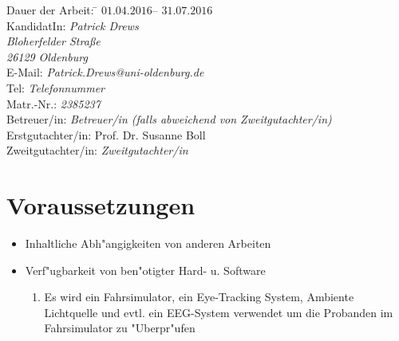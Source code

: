 \documentclass[a4paper, 11pt]{article}
\makeatletter
\newcommand{\KandidatIn}{\emph{Patrick Drews}}
\newcommand{\KandStrasse}{\emph{Bloherfelder Stra{\ss}e}}
\newcommand{\KandPlz}{\emph{26129}}
\newcommand{\KandOrt}{\emph{Oldenburg}}
\newcommand{\KandEmail}{\emph{Patrick.Drews@uni-oldenburg.de}}
\newcommand{\KandTel}{\emph{Telefonnummer}}
\newcommand{\KandMatrNr}{\emph{2385237}}
\newcommand{\StartDatum}{$01.04.2016$}
\newcommand{\EndDatum}{$31.07.2016$}
\newcommand{\GutachterIn}{Prof. Dr. Susanne Boll}%
\newcommand{\ZweitgutachterIn}{\emph{Zweitgutachter/in}} %
\newcommand{\BetreuerIn}{\emph{Betreuer/in (falls abweichend von Zweitgutachter/in)}} %
\makeatother
\begin{document}
\begin{tabbing}
Dauer der Arbeit: \hspace{1.1cm} \= \StartDatum -- \EndDatum\\
\vspace{0.5ex}KandidatIn: \> \KandidatIn\\
\> \KandStrasse\\
\> \KandPlz{} \KandOrt\\
\> E-Mail: \KandEmail{}\\
\> Tel: \KandTel{}\\
\> Matr.-Nr.: \KandMatrNr\\
\vspace{0.5ex}Betreuer/in: \> \BetreuerIn\\
Erstgutachter/in: \> \GutachterIn\\
Zweitgutachter/in: \> \ZweitgutachterIn\\
\end{tabbing}


\section {Voraussetzungen}

\begin{itemize}
\item Inhaltliche Abh"{a}ngigkeiten von anderen Arbeiten
\item Verf"{u}gbarkeit von ben"{o}tigter Hard- u. Software
	\begin{enumerate}
	\item Es wird ein Fahrsimulator, ein Eye-Tracking System, Ambiente Lichtquelle und evtl. ein EEG-System verwendet um die Probanden im Fahrsimulator zu "{U}berpr"{u}fen
	\end{enumerate}
\end{itemize}

\end{document}
